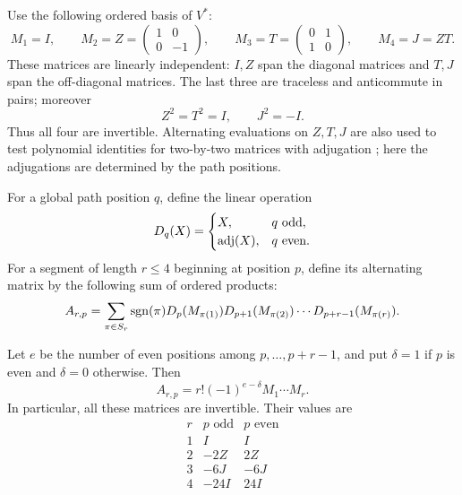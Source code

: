 Use the following ordered basis of $V^*$:
\begin{equation}\label{path:matrix-basis}
 M_1=I,\qquad
 M_2=Z=\begin{pmatrix}1&0\\0&-1\end{pmatrix},\qquad
 M_3=T=\begin{pmatrix}0&1\\1&0\end{pmatrix},\qquad
 M_4=J=ZT.
\end{equation}
These matrices are linearly independent: $I,Z$ span the diagonal
matrices and $T,J$ span the off-diagonal matrices. The last three are
traceless and anticommute in pairs; moreover
\[
 Z^2=T^2=I,\qquad J^2=-I.
\]
Thus all four are invertible. Alternating evaluations on $Z,T,J$ are also
used to test polynomial identities for two-by-two matrices with adjugation
\cite[Section~3]{drenskygiambruno1994}; here the adjugations are determined
by the path positions.

For a global path position $q$, define the linear operation
\[
 D_q(X)=
 \begin{cases}
 X,&q\text{ odd},\\
 \operatorname{adj}(X),&q\text{ even}.
 \end{cases}
\]
For a segment of length $r\leq4$ beginning at position $p$, define its
alternating matrix by the following sum of ordered products:
\begin{equation}\label{path:segment-definition}
 A_{r,p}=\sum_{\pi\in S_r}\operatorname{sgn}(\pi)
      D_p(M_{\pi(1)})D_{p+1}(M_{\pi(2)})\cdots
      D_{p+r-1}(M_{\pi(r)}).
\end{equation}

\begin{lemma}\label{path:segment}
Let $e$ be the number of even positions among $p,\ldots,p+r-1$, and put
$\delta=1$ if $p$ is even and $\delta=0$ otherwise. Then
\begin{equation}\label{path:segment-formula}
 A_{r,p}=r!(-1)^{e-\delta}M_1\cdots M_r.
\end{equation}
In particular, all these matrices are invertible. Their values are
\begin{equation}\label{path:segment-table}
 \begin{array}{c|cc}
 r & p\text{ odd} & p\text{ even}\\ \hline
 1&I&I\\
 2&-2Z&2Z\\
 3&-6J&-6J\\
 4&-24I&24I
 \end{array}
\end{equation}
\end{lemma}

